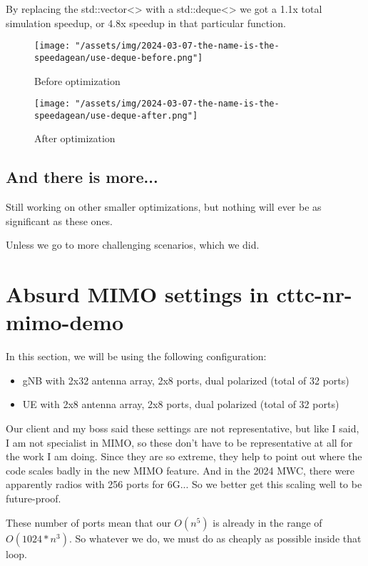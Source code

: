 \documentclass{article}
\begin{document}
By replacing the std::vector<> with a std::deque<> we got a 1.1x total
simulation speedup, or 4.8x speedup in that particular function.

\begin{figure}
    \texttt{[image: "/assets/img/2024-03-07-the-name-is-the-speedagean/use-deque-before.png"]}
    \caption{Before optimization}
    \label{fig:use-deque-before}
\end{figure}

\begin{figure}
    \texttt{[image: "/assets/img/2024-03-07-the-name-is-the-speedagean/use-deque-after.png"]}
    \caption{After optimization}
    \label{fig:use-deque-after}
\end{figure}

\subsection{And there is more...}

Still working on other smaller optimizations,
but nothing will ever be as significant as these ones.

Unless we go to more challenging scenarios, which we did.

\section{Absurd MIMO settings in cttc-nr-mimo-demo}

In this section, we will be using the following configuration:

\begin{itemize}
\item gNB with 2x32 antenna array, 2x8 ports, dual polarized (total of 32 ports)
\item UE with 2x8 antenna array, 2x8 ports, dual polarized (total of 32 ports)
\end{itemize}

Our client and my boss said these settings are not representative, but like
I said, I am not specialist in MIMO, so these don't have to be representative
at all for the work I am doing. Since they are so extreme, they help to point out
where the code scales badly in the new MIMO feature. And in the 2024 MWC, there
were apparently radios with 256 ports for 6G...
So we better get this scaling well to be future-proof.

These number of ports mean that our $O(n^5)$ is already in the range of $O(1024*n^3)$.
So whatever we do, we must do as cheaply as possible inside that loop.
\end{document}
